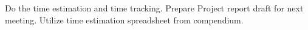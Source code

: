 \nextItem Do the time estimation and time tracking.
\nextItem Prepare Project report draft for next meeting.
\nextItem Utilize time estimation spreadsheet from compendium.

